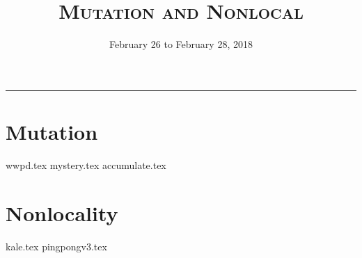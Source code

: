 \documentclass{exam}
\title{\textsc{Mutation and Nonlocal}}
\date{February 26 to February 28, 2018}
\begin{document}
\maketitle
\rule{\textwidth}{0.15em}
\fontsize{12}{15}\selectfont

\section{Mutation}
\begin{questions}
{wwpd.tex}
\newpage
{mystery.tex}
\newpage
{accumulate.tex}
\end{questions}

\newpage
\section{Nonlocality}
\begin{questions}
{kale.tex}
{pingpongv3.tex} 
\end{questions}
\end{document}
